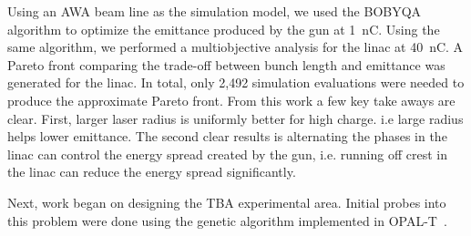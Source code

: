 Using an AWA beam line as the simulation model, we used the BOBYQA algorithm 
to optimize the emittance produced by the gun at \SI{1}{nC}.
Using the same algorithm, we performed a multiobjective analysis for the linac at \SI{40}{nC}. 
A Pareto front comparing the trade-off between bunch length and emittance was generated for the linac. 
In total, only 2,492 simulation evaluations were needed to produce the approximate Pareto front.
From this work a few key take aways are clear. First, larger laser radius
is uniformly better for high charge. i.e large radius helps lower emittance.
The second clear results is alternating the phases in the linac can control 
the energy spread created by the gun, i.e. running off crest in the linac 
can reduce the energy spread significantly.

 \label{sec:ga}
Next, work began on designing the TBA experimental area. 
Initial probes into this problem were done using the genetic algorithm
implemented in OPAL-T~\cite{optpilot}.
